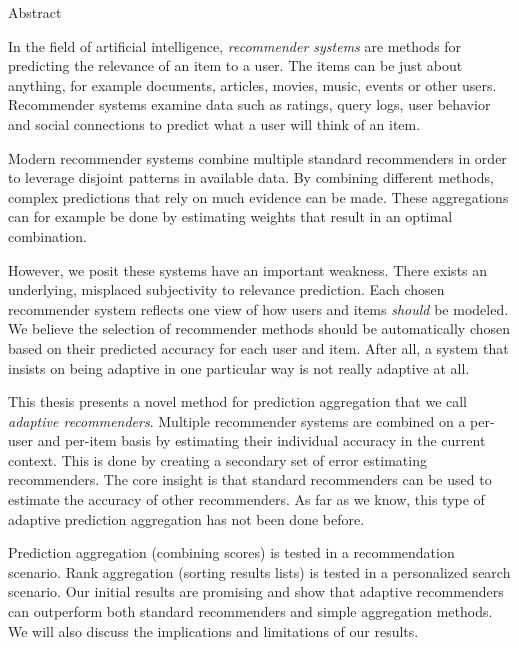 \null\vspace{4em}
{
  \centering
  \normalfont
  \huge
  \noindent
  Abstract\\
}
\vspace{2em}

\noindent
In the field of artificial intelligence,
\emph{recommender systems} are methods
for predicting the relevance of an item to a user.
The items can be just about anything, for example 
documents, articles, movies, music, events or other users.
Recommender systems examine data such as ratings, query logs,
user behavior and social connections to predict
what a user will think of an item.

Modern recommender systems
combine multiple standard recommenders
in order to leverage disjoint patterns in available data.
By combining different methods,
complex predictions that rely on much evidence can be made.
These aggregations can for example be done 
by estimating weights that result in an optimal combination.

However, we posit these systems have an important weakness.
There exists an underlying, misplaced subjectivity to relevance prediction.
Each chosen recommender system reflects one view of 
how users and items \emph{should} be modeled.
We believe the selection of recommender methods should 
be automatically chosen based on their predicted accuracy for each user and item.
After all, a system that insists on being adaptive
in one particular way is not really adaptive at all.

This thesis presents a novel method for prediction aggregation
that we call \emph{adaptive recommenders}.
Multiple recommender systems are combined on a per-user and per-item basis
by estimating their individual accuracy in the current context.
This is done by creating a secondary set of error estimating recommenders.
The core insight is that standard recommenders can be used
to estimate the accuracy of other recommenders.
As far as we know, this type of adaptive prediction aggregation
has not been done before.

Prediction aggregation (combining scores) is tested in a recommendation scenario.
Rank aggregation (sorting results lists) is tested in a personalized search scenario.
Our initial results are promising and show that adaptive recommenders
can outperform both standard recommenders and simple aggregation methods.
We will also discuss the implications and limitations of our results.

\cleardoublepage
